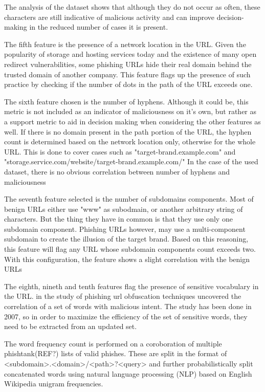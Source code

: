 The analysis of the dataset shows that although they do not occur as often, these characters are still indicative of malicious activity and can improve decision-making in the reduced number of cases it is present.


The fifth feature is the presence of a network location in the URL. Given the popularity of storage and hosting services today and the existence of many open redirect vulnerabilities, some phishing URLs hide their real domain behind the trusted domain of another company. This feature flags up the presence of such practice by checking if the number of dots in the path of the URL exceeds one.

The sixth feature chosen is the number of hyphens. Although it could be, this metric is not included as an indicator of maliciousness on it's own, but rather as a support metric to aid in decision making when considering the other features as well. If there is no domain present in the path portion of the URL, the hyphen count is determined based on the network location only, otherwise for the whole URL. This is done to cover cases such as "target-brand.example.com" and "storage.service.com/website/target-brand.example.com/"
In the case of the used dataset, there is no obvious correlation between number of hyphens and maliciousness

The seventh feature selected is the number of subdomains components. Most of benign URLs either use "www" as subodmain, or another arbitrary string of characters. But the thing they have in common is that they use only one subdomain component. Phishing URLs however, may use a multi-component subdomain to create the illusion of the target brand. Based on this reasoning, this feature will flag any URL whose subdomain components count exceeds two. With this configuration, the feature shows a slight correlation with the benign URLs

The eighth, nineth and tenth features flag the presence of sensitive vocabulary in the URL. \cite{10.1145/1314389.1314391} in the study of phishing url obfuscation techniques uncovered the correlation of a set of words with malicious intent. The study has been done in 2007, so in order to maximize the efficiency of the set of sensitive words, they need to be extracted from an updated set.

The word frequency count is performed on a coroboration of multiple phishtank(REF?) lists of valid phishes. These are split in the format of <subdomain>.<domain>/<path>?<query> and further probabilistically split concatenated words using natural language processing (NLP) based on English Wikipedia unigram frequencies.

